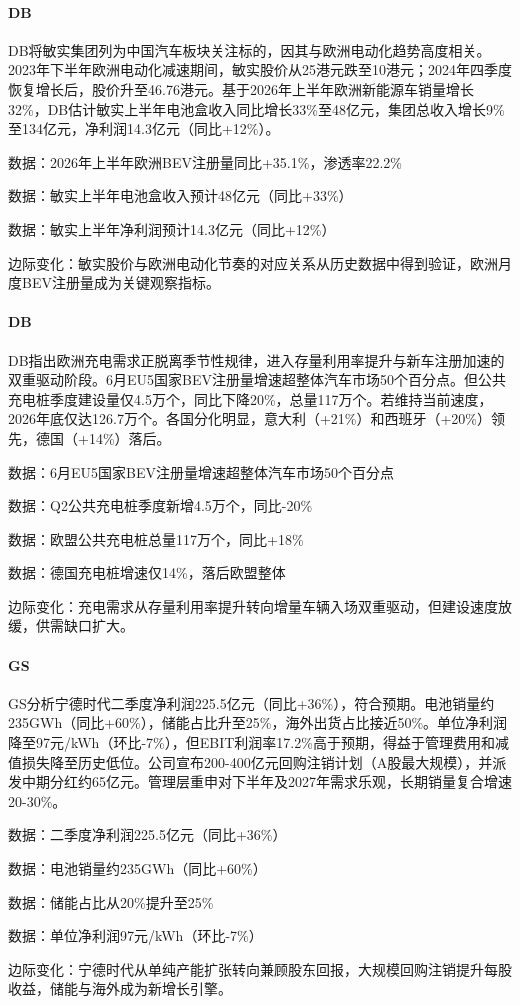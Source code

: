 \documentclass[11pt]{ctexart}
\begin{document}
\paragraph{DB} DB将敏实集团列为中国汽车板块关注标的，因其与欧洲电动化趋势高度相关。2023年下半年欧洲电动化减速期间，敏实股价从25港元跌至10港元；2024年四季度恢复增长后，股价升至46.76港元。基于2026年上半年欧洲新能源车销量增长32\%，DB估计敏实上半年电池盒收入同比增长33\%至48亿元，集团总收入增长9\%至134亿元，净利润14.3亿元（同比+12\%）。
{\small\color{refgray}数据：2026年上半年欧洲BEV注册量同比+35.1\%，渗透率22.2\%\par}
{\small\color{refgray}数据：敏实上半年电池盒收入预计48亿元（同比+33\%）\par}
{\small\color{refgray}数据：敏实上半年净利润预计14.3亿元（同比+12\%）\par}
{\small\color{refgray}边际变化：敏实股价与欧洲电动化节奏的对应关系从历史数据中得到验证，欧洲月度BEV注册量成为关键观察指标。\par}
\paragraph{DB} DB指出欧洲充电需求正脱离季节性规律，进入存量利用率提升与新车注册加速的双重驱动阶段。6月EU5国家BEV注册量增速超整体汽车市场50个百分点。但公共充电桩季度建设量仅4.5万个，同比下降20\%，总量117万个。若维持当前速度，2026年底仅达126.7万个。各国分化明显，意大利（+21\%）和西班牙（+20\%）领先，德国（+14\%）落后。
{\small\color{refgray}数据：6月EU5国家BEV注册量增速超整体汽车市场50个百分点\par}
{\small\color{refgray}数据：Q2公共充电桩季度新增4.5万个，同比-20\%\par}
{\small\color{refgray}数据：欧盟公共充电桩总量117万个，同比+18\%\par}
{\small\color{refgray}数据：德国充电桩增速仅14\%，落后欧盟整体\par}
{\small\color{refgray}边际变化：充电需求从存量利用率提升转向增量车辆入场双重驱动，但建设速度放缓，供需缺口扩大。\par}
\paragraph{GS} GS分析宁德时代二季度净利润225.5亿元（同比+36\%），符合预期。电池销量约235GWh（同比+60\%），储能占比升至25\%，海外出货占比接近50\%。单位净利润降至97元/kWh（环比-7\%），但EBIT利润率17.2\%高于预期，得益于管理费用和减值损失降至历史低位。公司宣布200-400亿元回购注销计划（A股最大规模），并派发中期分红约65亿元。管理层重申对下半年及2027年需求乐观，长期销量复合增速20-30\%。
{\small\color{refgray}数据：二季度净利润225.5亿元（同比+36\%）\par}
{\small\color{refgray}数据：电池销量约235GWh（同比+60\%）\par}
{\small\color{refgray}数据：储能占比从20\%提升至25\%\par}
{\small\color{refgray}数据：单位净利润97元/kWh（环比-7\%）\par}
{\small\color{refgray}边际变化：宁德时代从单纯产能扩张转向兼顾股东回报，大规模回购注销提升每股收益，储能与海外成为新增长引擎。\par}
\end{document}
